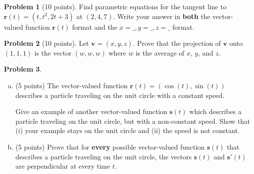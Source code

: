\documentclass[11pt,oneside]{amsart}
\theoremstyle{definition}
\newtheorem{problem}{Problem}
\theoremstyle{plain}
\newcommand{\br}{{\mathbf{r}}}
\newcommand{\bs}{{\mathbf{s}}}
\newcommand{\bv}{{\mathbf{v}}}
\begin{document}
\newpage

\begin{problem}[10 points]
  Find parametric equations for the tangent line to $\br(t)=(t,t^2,2t+3)$ at $(2,4,7)$. Write your answer in \textbf{both} the vector-valued function $\br(t)$ format and the $x=\_,y=\_,z=\_$ format.
\end{problem}

\newpage

\begin{problem}[10 points]
  Let $\bv=(x,y,z)$. Prove that the projection of $\bv$ onto $(1,1,1)$ is the vector $(w,w,w)$ where $w$ is the average of $x$, $y$, and $z$.
\end{problem}

\newpage

\begin{problem}\leavevmode
  \begin{enumerate}[(a)]
    \item (5 points) The vector-valued function $\br(t)=(\cos(t),\sin(t))$ describes a particle traveling on the unit circle with a constant speed.

    Give an example of another vector-valued function $\bs(t)$ which describes a particle traveling on the unit circle, but with a non-constant speed. Show that (i) your example stays on the unit circle and (ii) the speed is not constant.
    \vfill
    \item (5 points) Prove that for \textbf{every} possible vector-valued function $\bs(t)$ that describes a particle traveling on the unit circle, the vectors $\bs(t)$ and $\bs'(t)$ are perpendicular at every time $t$.
    \vfill
    \vfill
  \end{enumerate}
\end{problem}
\end{document}
